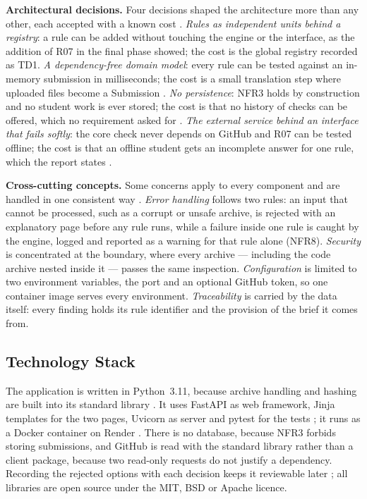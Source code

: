 \documentclass[a4paper,11pt]{article}
\begin{document}
\textbf{Architectural decisions.} Four decisions shaped the architecture more
than any other, each accepted with a known cost \citep{Ford2021}.
\textit{Rules as independent units behind a registry}: a rule can be added without
touching the engine or the interface, as the addition of R07 in the final phase
showed; the cost is the global registry recorded as TD1.
\textit{A dependency-free domain model}: every rule can be tested against an
in-memory submission in milliseconds; the cost is a small translation step where
uploaded files become a Submission \citep{Percival2020}.
\textit{No persistence}: NFR3 holds by construction and no student work is ever
stored; the cost is that no history of checks can be offered, which no
requirement asked for \citep{OWASP2021}.
\textit{The external service behind an interface that fails softly}: the core
check never depends on GitHub and R07 can be tested offline; the cost is that an
offline student gets an incomplete answer for one rule, which the report states
\citep{Newman2021}.

\textbf{Cross-cutting concepts.} Some concerns apply to every component and are
handled in one consistent way \citep{Bass2021}. \textit{Error handling} follows
two rules: an input that cannot be processed, such as a corrupt or unsafe
archive, is rejected with an explanatory page before any rule runs, while a
failure inside one rule is caught by the engine, logged and reported as a warning
for that rule alone (NFR8). \textit{Security} is concentrated at the boundary,
where every archive --- including the code archive nested inside it --- passes
the same inspection. \textit{Configuration} is limited to two environment
variables, the port and an optional GitHub token, so one container image serves
every environment. \textit{Traceability} is carried by the data itself: every
finding holds its rule identifier and the provision of the brief it comes from.

\subsection{Technology Stack}\label{sec:stack}

The application is written in Python~3.11, because archive handling and hashing
are built into its standard library \citep{PSF2025}. It uses FastAPI as web
framework, Jinja templates for the two pages, Uvicorn as server and pytest for
the tests \citep{FastAPI2025, Jinja2025, Uvicorn2025, Pytest2025}; it runs as a
Docker container on Render \citep{Docker2024, Render2025}. There is no database,
because NFR3 forbids storing submissions, and GitHub is read with the standard
library rather than a client package, because two read-only requests do not
justify a dependency. Recording the rejected options with each decision keeps it
reviewable later \citep{Ford2021}; all libraries are open source under the MIT,
BSD or Apache licence.
\end{document}
